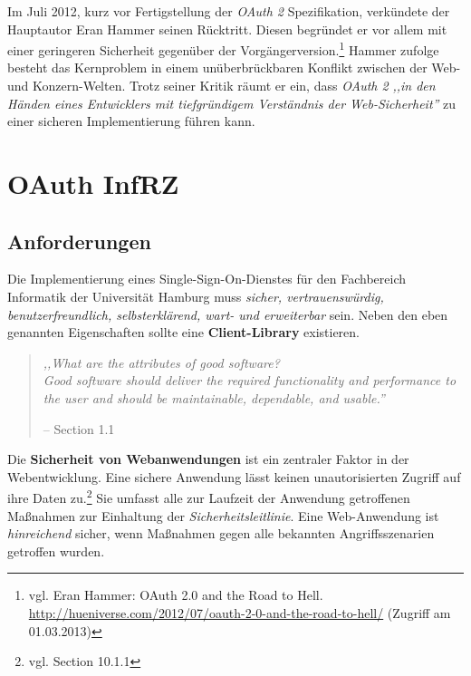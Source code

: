 \documentclass[12pt,a4paper,pointednumbers,abstracton]{scrartcl}
\begin{document}
Im Juli 2012, kurz vor Fertigstellung der \emph{OAuth 2} Spezifikation, verkündete der Hauptautor Eran Hammer seinen Rücktritt.
Diesen begründet er vor allem mit einer geringeren Sicherheit gegenüber der Vorgängerversion.\footnote{vgl. Eran Hammer: OAuth 2.0 and the Road to Hell. \url{http://hueniverse.com/2012/07/oauth-2-0-and-the-road-to-hell/} (Zugriff am 01.03.2013)}
Hammer zufolge besteht das Kernproblem in einem unüberbrückbaren Konflikt zwischen der Web- und Konzern-Welten.
Trotz seiner Kritik räumt er ein, dass \emph{OAuth 2} \emph{,,in den Händen eines Entwicklers mit tiefgründigem Verständnis der Web-Sicherheit''} zu einer sicheren Implementierung führen kann.


\newpage
\section{OAuth InfRZ}
\label{sec:oauth-infrz}

\subsection{Anforderungen}
\label{sec:oauth-infrz/requirements}

Die Implementierung eines Single-Sign-On-Dienstes für den Fachbereich Informatik der Universität Hamburg muss \emph{sicher, vertrauenswürdig, benutzerfreundlich, selbsterklärend, wart- und erweiterbar} sein.
Neben den eben genannten Eigenschaften sollte eine \textbf{Client-Library} existieren.

\begin{quote}
\emph{,,What are the attributes of good software?\\
Good software should deliver the required functionality and performance to the user and should be maintainable, dependable, and usable.''}
\begin{flushright}
\small{-- \cite{Som10} Section 1.1}
\end{flushright}
\end{quote}

Die \textbf{Sicherheit von Webanwendungen} ist ein zentraler Faktor in der Webentwicklung.
Eine sichere Anwendung lässt keinen unautorisierten Zugriff auf ihre Daten zu.\footnote{vgl. \cite{Som10} Section 10.1.1}
Sie umfasst alle zur Laufzeit der Anwendung getroffenen Maßnahmen zur Einhaltung der \emph{Sicherheitsleitlinie}.
Eine Web-Anwendung ist \emph{hinreichend} sicher, wenn Maßnahmen gegen alle bekannten Angriffsszenarien getroffen wurden.
\end{document}

